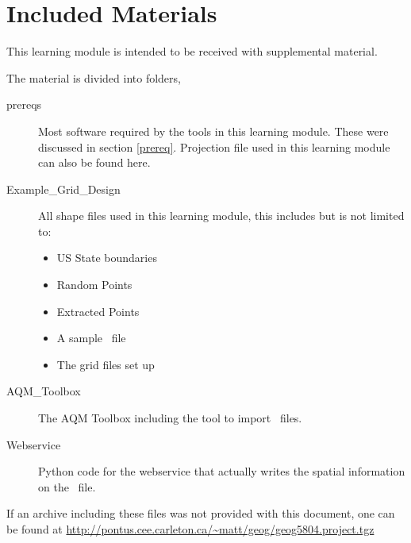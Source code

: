 \section{Included Materials}

This learning module is intended to be received with supplemental
material.

The material is divided into folders, 
\begin{description}
	\item[prereqs] Most software required by the tools in this
learning module.  These were discussed in section \ref{prereq}.
Projection file used in this learning module can also be found here.
	\item[Example\_Grid\_Design] All shape files used in this learning
module, this includes but is not limited to: \begin{itemize}
		\item US State boundaries
		\item Random Points
		\item Extracted Points
		\item A sample \ioapi~file
		\item The grid files set up
	\end{itemize}
	\item[AQM\_Toolbox] The AQM Toolbox including the tool to import
\ioapi~files.
	\item[Webservice] Python code for the webservice that actually
writes the spatial information on the \ioapi~file.
\end{description}

If an archive including these files was not provided with this
document, one can be found at
\url{http://pontus.cee.carleton.ca/~matt/geog/geog5804.project.tgz}
